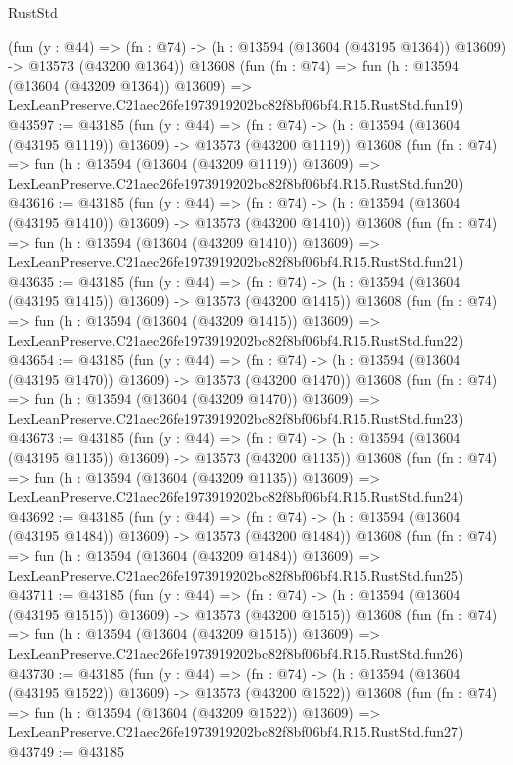 \begin{lexlean}{RustStd}
\begin{coremodule}
    (fun (y : @44) =>
    (fn : @74) -> (h : @13594 (@13604 (@43195 @1364)) @13609) -> @13573 (@43200 @1364))
    @13608
    (fun (fn : @74) =>
    fun (h : @13594 (@13604 (@43209 @1364)) @13609) =>
    LexLeanPreserve.C21aec26fe1973919202bc82f8bf06bf4.R15.RustStd.fun19)
@43597 := @43185
    (fun (y : @44) =>
    (fn : @74) -> (h : @13594 (@13604 (@43195 @1119)) @13609) -> @13573 (@43200 @1119))
    @13608
    (fun (fn : @74) =>
    fun (h : @13594 (@13604 (@43209 @1119)) @13609) =>
    LexLeanPreserve.C21aec26fe1973919202bc82f8bf06bf4.R15.RustStd.fun20)
@43616 := @43185
    (fun (y : @44) =>
    (fn : @74) -> (h : @13594 (@13604 (@43195 @1410)) @13609) -> @13573 (@43200 @1410))
    @13608
    (fun (fn : @74) =>
    fun (h : @13594 (@13604 (@43209 @1410)) @13609) =>
    LexLeanPreserve.C21aec26fe1973919202bc82f8bf06bf4.R15.RustStd.fun21)
@43635 := @43185
    (fun (y : @44) =>
    (fn : @74) -> (h : @13594 (@13604 (@43195 @1415)) @13609) -> @13573 (@43200 @1415))
    @13608
    (fun (fn : @74) =>
    fun (h : @13594 (@13604 (@43209 @1415)) @13609) =>
    LexLeanPreserve.C21aec26fe1973919202bc82f8bf06bf4.R15.RustStd.fun22)
@43654 := @43185
    (fun (y : @44) =>
    (fn : @74) -> (h : @13594 (@13604 (@43195 @1470)) @13609) -> @13573 (@43200 @1470))
    @13608
    (fun (fn : @74) =>
    fun (h : @13594 (@13604 (@43209 @1470)) @13609) =>
    LexLeanPreserve.C21aec26fe1973919202bc82f8bf06bf4.R15.RustStd.fun23)
@43673 := @43185
    (fun (y : @44) =>
    (fn : @74) -> (h : @13594 (@13604 (@43195 @1135)) @13609) -> @13573 (@43200 @1135))
    @13608
    (fun (fn : @74) =>
    fun (h : @13594 (@13604 (@43209 @1135)) @13609) =>
    LexLeanPreserve.C21aec26fe1973919202bc82f8bf06bf4.R15.RustStd.fun24)
@43692 := @43185
    (fun (y : @44) =>
    (fn : @74) -> (h : @13594 (@13604 (@43195 @1484)) @13609) -> @13573 (@43200 @1484))
    @13608
    (fun (fn : @74) =>
    fun (h : @13594 (@13604 (@43209 @1484)) @13609) =>
    LexLeanPreserve.C21aec26fe1973919202bc82f8bf06bf4.R15.RustStd.fun25)
@43711 := @43185
    (fun (y : @44) =>
    (fn : @74) -> (h : @13594 (@13604 (@43195 @1515)) @13609) -> @13573 (@43200 @1515))
    @13608
    (fun (fn : @74) =>
    fun (h : @13594 (@13604 (@43209 @1515)) @13609) =>
    LexLeanPreserve.C21aec26fe1973919202bc82f8bf06bf4.R15.RustStd.fun26)
@43730 := @43185
    (fun (y : @44) =>
    (fn : @74) -> (h : @13594 (@13604 (@43195 @1522)) @13609) -> @13573 (@43200 @1522))
    @13608
    (fun (fn : @74) =>
    fun (h : @13594 (@13604 (@43209 @1522)) @13609) =>
    LexLeanPreserve.C21aec26fe1973919202bc82f8bf06bf4.R15.RustStd.fun27)
@43749 := @43185

\end{coremodule}
\end{lexlean}
